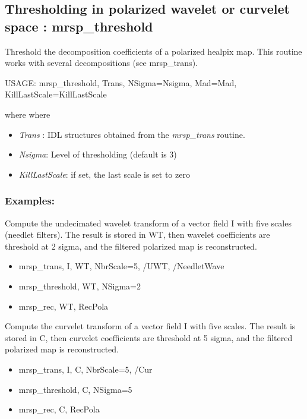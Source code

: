 \subsection{Thresholding in polarized wavelet or curvelet space  : mrsp\_threshold}

Threshold the decomposition coefficients of a polarized healpix map. This routine works with several decompositions (see mrsp\_trans).
{\bf
\begin{center}
     USAGE:  mrsp\_threshold, Trans, NSigma=Nsigma, Mad=Mad, KillLastScale=KillLastScale
\end{center}}
where
where
\begin{itemize}
\item {\em Trans} : IDL structures obtained from the {\em mrsp\_trans} routine.
\item {\em Nsigma}: Level of thresholding (default is 3)
\item {\em KillLastScale}: if set, the last scale is set to zero
\end{itemize}

\subsubsection*{Examples:} 
 Compute the undecimated wavelet transform of a vector field I with five scales (needlet filters).  The result is stored in WT, then wavelet coefficients are threshold at 2 sigma, and the filtered polarized map is reconstructed.
\begin{itemize}
\item  mrsp\_trans, I, WT, NbrScale=5, /UWT, /NeedletWave
\item  mrsp\_threshold, WT, NSigma=2
\item  mrsp\_rec, WT, RecPola
\end{itemize}
Compute the curvelet transform of a vector field I with five scales.  The result is stored in C, then curvelet coefficients are threshold at 5 sigma, and the filtered polarized map 
is reconstructed.
\begin{itemize}
\item  mrsp\_trans, I, C, NbrScale=5, /Cur
\item  mrsp\_threshold, C, NSigma=5
\item  mrsp\_rec, C, RecPola
\end{itemize}
